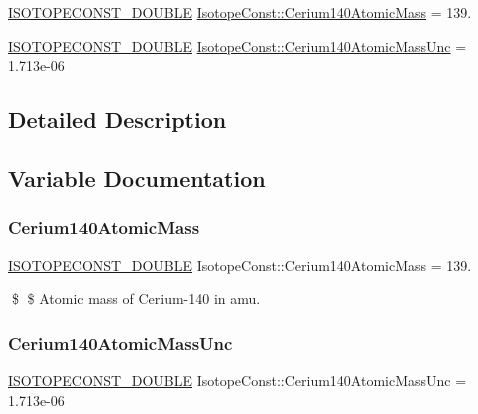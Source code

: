 \begin{DoxyCompactItemize}
\item 
\mbox{\hyperlink{group___isotope_const-_macros_ga8f45a7272ce02c0b4c65c44636ed719a}{I\+S\+O\+T\+O\+P\+E\+C\+O\+N\+S\+T\+\_\+\+D\+O\+U\+B\+LE}} \mbox{\hyperlink{group___isotope_const-_cerium-_ce140_ga8367d980136b363b201258f4e413c178}{Isotope\+Const\+::\+Cerium140\+Atomic\+Mass}} = 139.
\item 
\mbox{\hyperlink{group___isotope_const-_macros_ga8f45a7272ce02c0b4c65c44636ed719a}{I\+S\+O\+T\+O\+P\+E\+C\+O\+N\+S\+T\+\_\+\+D\+O\+U\+B\+LE}} \mbox{\hyperlink{group___isotope_const-_cerium-_ce140_gaf8fa82c0ab7079022950153d36e1b45a}{Isotope\+Const\+::\+Cerium140\+Atomic\+Mass\+Unc}} = 1.\+713e-\/06
\end{DoxyCompactItemize}


\subsection{Detailed Description}


\subsection{Variable Documentation}
\mbox{\label{group___isotope_const-_cerium-_ce140_ga8367d980136b363b201258f4e413c178}} 
\subsubsection{\texorpdfstring{Cerium140\+Atomic\+Mass}{Cerium140AtomicMass}}
{\footnotesize\ttfamily \mbox{\hyperlink{group___isotope_const-_macros_ga8f45a7272ce02c0b4c65c44636ed719a}{I\+S\+O\+T\+O\+P\+E\+C\+O\+N\+S\+T\+\_\+\+D\+O\+U\+B\+LE}} Isotope\+Const\+::\+Cerium140\+Atomic\+Mass = 139.}

\$ \$ Atomic mass of Cerium-\/140 in amu. \mbox{\label{group___isotope_const-_cerium-_ce140_gaf8fa82c0ab7079022950153d36e1b45a}} 
\subsubsection{\texorpdfstring{Cerium140\+Atomic\+Mass\+Unc}{Cerium140AtomicMassUnc}}
{\footnotesize\ttfamily \mbox{\hyperlink{group___isotope_const-_macros_ga8f45a7272ce02c0b4c65c44636ed719a}{I\+S\+O\+T\+O\+P\+E\+C\+O\+N\+S\+T\+\_\+\+D\+O\+U\+B\+LE}} Isotope\+Const\+::\+Cerium140\+Atomic\+Mass\+Unc = 1.\+713e-\/06}

